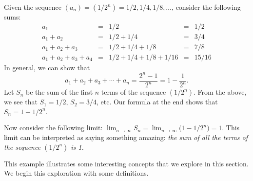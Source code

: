\documentclass{ximera}
\begin{document}
\begin{image}
\end{image}




Given the sequence $(a_n) = (1/2^n) = 1/2, 1/4, 1/8, \ldots$, consider
the following sums:
\[
\begin{array}{ccccc}
a_1				&=& 1/2					 &=& 1/2\\
a_1+a_2		&=& 1/2+1/4			 &=& 3/4\\
a_1+a_2+a_3 &=& 1/2+1/4+1/8  &=& 7/8\\
a_1+a_2+a_3+a_4 &=& 1/2+1/4+1/8+1/16 & =& 15/16
\end{array}
\]
In general, we can show that
\[
a_1+a_2+a_3+\cdots +a_n = \frac{2^n-1}{2^n} = 1-\frac{1}{2^n}.
\]
Let $S_n$ be the sum of the first $n$ terms of the sequence
$(1/2^n)$. From the above, we see that $S_1=1/2$, $S_2 = 3/4$,
etc. Our formula at the end shows that $S_n = 1-1/2^n$.

Now consider the following limit: $\lim_{n\to\infty}S_n =
\lim_{n\to\infty}\big(1-1/2^n\big) = 1$. This limit can be interpreted
as saying something amazing: \emph{the sum of \emph{all} the terms of
  the sequence $(1/2^n)$ is 1.}

This example illustrates some interesting concepts that we explore in
this section. We begin this exploration with some definitions.
\end{document}
